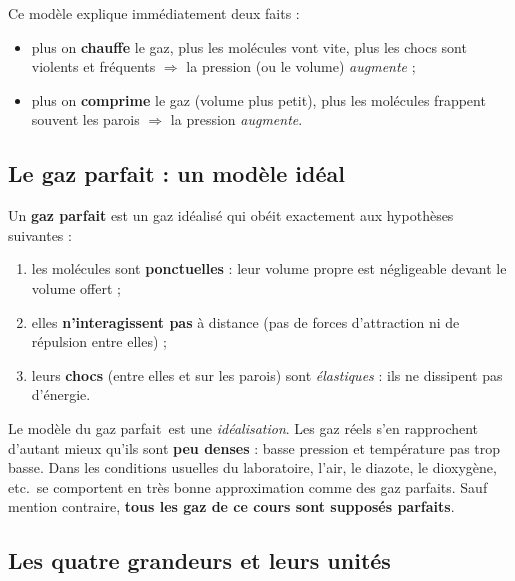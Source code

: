 \documentclass[11pt,a4paper]{article}
\newcommand{\gp}{gaz parfait}
\newcommand{\GP}{gaz parfaits}
\begin{document}
\noindent Ce modèle explique immédiatement deux faits :
\begin{itemize}[leftmargin=1.6em,topsep=2pt,itemsep=1.5pt]
  \item plus on \textbf{chauffe} le gaz, plus les molécules vont vite, plus les chocs sont violents et
        fréquents $\Rightarrow$ la pression (ou le volume) \emph{augmente} ;
  \item plus on \textbf{comprime} le gaz (volume plus petit), plus les molécules frappent souvent les
        parois $\Rightarrow$ la pression \emph{augmente}.
\end{itemize}

\subsection{Le gaz parfait : un modèle idéal}

\begin{definition}
Un \textbf{\gp} est un gaz idéalisé qui obéit exactement aux hypothèses suivantes :
\begin{enumerate}[leftmargin=1.8em,topsep=2pt,itemsep=1.5pt,label=(\arabic*)]
  \item les molécules sont \textbf{ponctuelles} : leur volume propre est négligeable devant le volume
        offert ;
  \item elles \textbf{n'interagissent pas} à distance (pas de forces d'attraction ni de répulsion entre
        elles) ;
  \item leurs \textbf{chocs} (entre elles et sur les parois) sont \emph{élastiques} : ils ne dissipent
        pas d'énergie.
\end{enumerate}
\end{definition}

\begin{remarque}
Le modèle du \gp\ est une \emph{idéalisation}. Les gaz réels s'en rapprochent d'autant mieux qu'ils
sont \textbf{peu denses} : basse pression et température pas trop basse. Dans les conditions usuelles
du laboratoire, l'air, le diazote, le dioxygène, etc.\ se comportent en très bonne approximation comme
des \GP. Sauf mention contraire, \textbf{tous les gaz de ce cours sont supposés parfaits}.
\end{remarque}

\subsection{Les quatre grandeurs et leurs unités}
\end{document}
